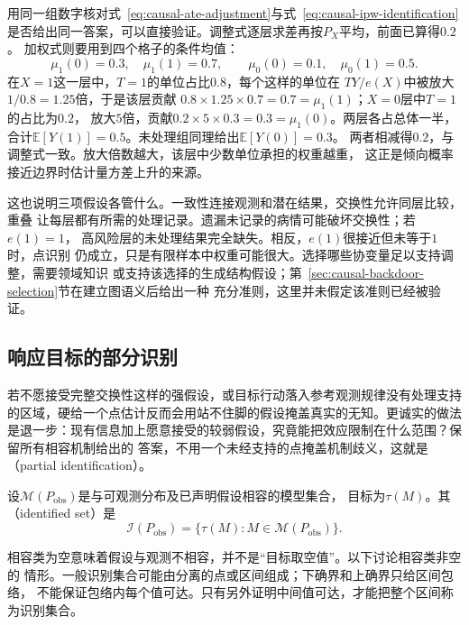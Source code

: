 用同一组数字核对式~\eqref{eq:causal-ate-adjustment}与式~\eqref{eq:causal-ipw-identification}
是否给出同一答案，可以直接验证。调整式逐层求差再按\(P_X\)平均，前面已算得\(0.2\)。
加权式则要用到四个格子的条件均值：
\[
  \mu_1(0)=0.3,\quad \mu_1(1)=0.7,\qquad
  \mu_0(0)=0.1,\quad \mu_0(1)=0.5.
\]
在\(X=1\)这一层中，\(T=1\)的单位占比\(0.8\)，每个这样的单位在
\(TY/e(X)\)中被放大\(1/0.8=1.25\)倍，于是该层贡献
\(0.8\times1.25\times0.7=0.7=\mu_1(1)\)；\(X=0\)层中\(T=1\)的占比为\(0.2\)，
放大\(5\)倍，贡献\(0.2\times5\times0.3=0.3=\mu_1(0)\)。两层各占总体一半，
合计\(\mathbb E[Y(1)]=0.5\)。未处理组同理给出\(\mathbb E[Y(0)]=0.3\)。
两者相减得\(0.2\)，与调整式一致。放大倍数越大，该层中少数单位承担的权重越重，
这正是倾向概率接近边界时估计量方差上升的来源。

这也说明三项假设各管什么。一致性连接观测和潜在结果，交换性允许同层比较，重叠
让每层都有所需的处理记录。遗漏未记录的病情可能破坏交换性；若\(e(1)=1\)，
高风险层的未处理结果完全缺失。相反，\(e(1)\)很接近但未等于\(1\)时，点识别
仍成立，只是有限样本中权重可能很大。选择哪些协变量足以支持调整，需要领域知识
或支持该选择的生成结构假设；第~\ref{sec:causal-backdoor-selection}节在建立图语义后给出一种
充分准则，这里并未假定该准则已经被验证。

\subsection{响应目标的部分识别}
\label{sec:causal-partial-identification-sensitivity}

若不愿接受完整交换性这样的强假设，或目标行动落入参考观测规律没有处理支持的区域，硬给一个点估计反而会用站不住脚的假设掩盖真实的无知。更诚实的做法是退一步：现有信息加上愿意接受的较弱假设，究竟能把效应限制在什么范围？保留所有相容机制给出的
答案，不用一个未经支持的点掩盖机制歧义，这就是（partial identification）。
\begin{definition}[识别集合]
  \label{def:causal-identified-set}
  设\(\mathcal M(P_{\mathrm{obs}})\)是与可观测分布及已声明假设相容的模型集合，
  目标为\(\tau(M)\)。其（identified set）是
  \begin{equation}
    \mathcal I(P_{\mathrm{obs}})
    =\{\tau(M):M\in\mathcal M(P_{\mathrm{obs}})\}.
    \label{eq:causal-identified-set}
  \end{equation}
\end{definition}
相容类为空意味着假设与观测不相容，并不是“目标取空值”。以下讨论相容类非空的
情形。一般识别集合可能由分离的点或区间组成；下确界和上确界只给区间包络，
不能保证包络内每个值可达。只有另外证明中间值可达，才能把整个区间称为识别集合。


